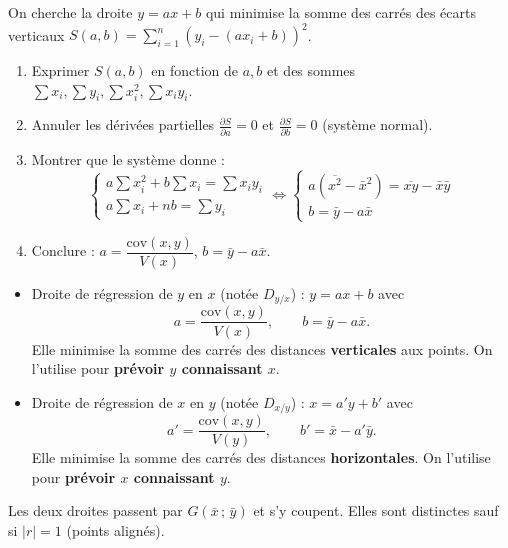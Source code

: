 \documentclass[11pt]{article}
\newcommand{\cle}[1]{{\popxbold\color{popdark}#1}}
\begin{document}
\begin{experience}
On cherche la droite $y=ax+b$ qui minimise la somme des carrés des écarts verticaux $S(a,b) = \sum_{i=1}^n (y_i - (ax_i+b))^2$.
\begin{enumerate}
  \item Exprimer $S(a,b)$ en fonction de $a,b$ et des sommes $\sum x_i, \sum y_i, \sum x_i^2, \sum x_i y_i$.
  \item Annuler les dérivées partielles $\frac{\partial S}{\partial a}=0$ et $\frac{\partial S}{\partial b}=0$ (système normal).
  \item Montrer que le système donne :
  \[
  \begin{cases}
  a\sum x_i^2 + b\sum x_i = \sum x_i y_i \\
  a\sum x_i + nb = \sum y_i
  \end{cases}
  \iff
  \begin{cases}
  a(\overline{x^2}-\bar{x}^2) = \overline{xy}-\bar{x}\bar{y} \\
  b = \bar{y} - a\bar{x}
  \end{cases}
  \]
  \item Conclure : $a = \dfrac{\mathrm{cov}(x,y)}{V(x)}$, $b = \bar{y} - a\bar{x}$.
\end{enumerate}
\end{experience}

\begin{propriete}
\begin{itemize}
  \item \cle{Droite de régression de $y$ en $x$} (notée $D_{y/x}$) : $y = ax + b$ avec
  \[
  a = \frac{\mathrm{cov}(x,y)}{V(x)},\qquad b = \bar{y} - a\bar{x}.
  \]
  Elle minimise la somme des carrés des distances \textbf{verticales} aux points. On l'utilise pour \textbf{prévoir $y$ connaissant $x$}.
  \item \cle{Droite de régression de $x$ en $y$} (notée $D_{x/y}$) : $x = a'y + b'$ avec
  \[
  a' = \frac{\mathrm{cov}(x,y)}{V(y)},\qquad b' = \bar{x} - a'\bar{y}.
  \]
  Elle minimise la somme des carrés des distances \textbf{horizontales}. On l'utilise pour \textbf{prévoir $x$ connaissant $y$}.
\end{itemize}
Les deux droites passent par $G(\bar{x}\,;\,\bar{y})$ et s'y coupent. Elles sont distinctes sauf si $|r|=1$ (points alignés).
\end{propriete}
\end{document}
